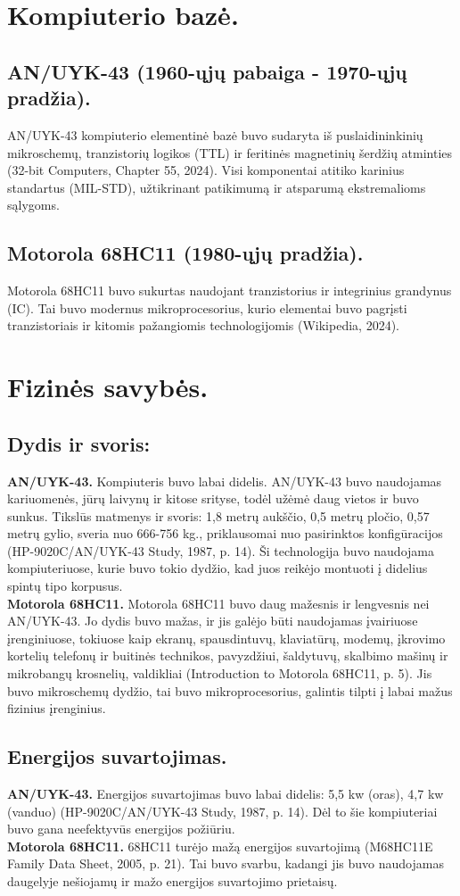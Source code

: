 \documentclass[a4paper,12pt]{article}
\begin{document}
\section{Kompiuterio bazė.}
\subsection{AN/UYK-43 (1960-ųjų pabaiga - 1970-ųjų pradžia).}
AN/UYK-43 kompiuterio elementinė bazė buvo sudaryta iš puslaidininkinių mikroschemų, tranzistorių logikos (TTL) ir feritinės magnetinių šerdžių atminties (32-bit Computers, Chapter 55, 2024). Visi komponentai atitiko karinius standartus (MIL-STD), užtikrinant patikimumą ir atsparumą ekstremalioms sąlygoms.
\subsection{Motorola 68HC11 (1980-ųjų pradžia).}
Motorola 68HC11 buvo sukurtas naudojant tranzistorius ir integrinius grandynus (IC). Tai buvo modernus mikroprocesorius, kurio elementai buvo pagrįsti tranzistoriais ir kitomis pažangiomis technologijomis (Wikipedia, 2024).

\section{Fizinės savybės.}
\subsection{Dydis ir svoris:}
\textbf{AN/UYK-43.} Kompiuteris buvo labai didelis. AN/UYK-43 buvo naudojamas kariuomenės, jūrų laivynų ir kitose srityse, todėl užėmė daug vietos ir buvo sunkus. Tikslūs matmenys ir svoris: 1,8 metrų aukščio, 0,5 metrų pločio, 0,57 metrų gylio, sveria nuo 666-756 kg., priklausomai nuo pasirinktos konfigūracijos (HP-9020C/AN/UYK-43 Study, 1987, p. 14). Ši technologija buvo naudojama kompiuteriuose, kurie buvo tokio dydžio, kad juos reikėjo montuoti į didelius spintų tipo korpusus.\\
\textbf{Motorola 68HC11.} Motorola 68HC11 buvo daug mažesnis ir lengvesnis nei AN/UYK-43. Jo dydis buvo mažas, ir jis galėjo būti naudojamas įvairiuose įrenginiuose, tokiuose kaip ekranų, spausdintuvų, klaviatūrų, modemų, įkrovimo kortelių telefonų ir buitinės technikos, pavyzdžiui, šaldytuvų, skalbimo mašinų ir mikrobangų krosnelių, valdikliai (Introduction to Motorola 68HC11, p. 5). Jis buvo mikroschemų dydžio, tai buvo mikroprocesorius, galintis tilpti į labai mažus fizinius įrenginius.
\subsection{Energijos suvartojimas.} 
\textbf{AN/UYK-43.} Energijos suvartojimas buvo labai didelis: 5,5 kw (oras), 4,7 kw (vanduo) (HP-9020C/AN/UYK-43 Study, 1987, p. 14). Dėl to šie kompiuteriai buvo gana neefektyvūs energijos požiūriu.\\
\textbf{Motorola 68HC11.} 68HC11 turėjo mažą energijos suvartojimą (M68HC11E Family Data Sheet, 2005, p. 21). Tai buvo svarbu, kadangi jis buvo naudojamas daugelyje nešiojamų ir mažo energijos suvartojimo prietaisų.
\end{document}
